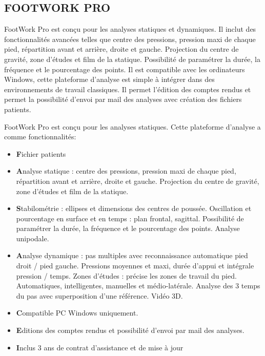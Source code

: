 \subsection{FOOTWORK PRO}

FootWork Pro est conçu pour les analyses statiques et dynamiques. 
Il inclut des fonctionnalités avancées telles que centre des pressions, 
pression maxi de chaque pied, répartition avant et arrière, droite et gauche. 
Projection du centre de gravité, zone d’études et film de la statique.  
Possibilité de paramétrer la durée, la fréquence et le pourcentage des points.
Il est compatible avec les ordinateurs Windows, cette plateforme d’analyse est simple à intégrer 
dans des environnements de travail classiques.
Il permet l'édition des comptes rendus et permet la possibilité d’envoi par mail 
des analyses avec création des fichiers patients.

FootWork Pro est conçu pour les analyses statiques. 
Cette plateforme d’analyse a comme fonctionnalités:

\begin{itemize}
    \item \textbf Fichier patients
    \item \textbf Analyse statique : centre des pressions, pression maxi de chaque pied, répartition avant et arrière, droite et gauche. Projection du centre de gravité, zone d’études et film de la statique.
    \item \textbf Stabilométrie : ellipses et dimensions des centres de poussée. Oscillation et pourcentage en surface et en temps : plan frontal, sagittal. Possibilité de paramétrer la durée, la fréquence et le pourcentage des points. Analyse unipodale.
    \item \textbf Analyse dynamique : pas multiples avec reconnaissance automatique pied droit / pied gauche. Pressions moyennes et maxi, durée d’appui et intégrale pression / temps. Zones d’études : précise les zones de travail du pied. Automatiques, intelligentes, manuelles et médio-latérale. Analyse des 3 temps du pas avec superposition d'une référence. Vidéo 3D.
    \item \textbf Compatible PC Windows uniquement.
    \item \textbf Editions des comptes rendus et possibilité d’envoi par mail des analyses.
    \item \textbf Inclus 3 ans de contrat d’assistance et de mise à jour
\end{itemize}

